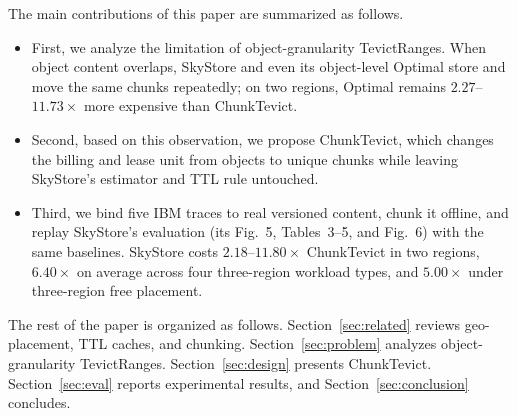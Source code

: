 The main contributions of this paper are summarized as follows.
\begin{itemize}
  \item First, we analyze the limitation of object-granularity TevictRanges.
  When object content overlaps, SkyStore and even its object-level Optimal store and move the same chunks repeatedly; on two regions, Optimal remains $2.27$--$11.73\times$ more expensive than ChunkTevict.
  \item Second, based on this observation, we propose ChunkTevict, which changes the billing and lease unit from objects to unique chunks while leaving SkyStore's estimator and {TTL} rule untouched.
  \item Third, we bind five {IBM} traces to real versioned content, chunk it offline, and replay SkyStore's evaluation (its Fig.~5, Tables~3--5, and Fig.~6) with the same baselines.
  SkyStore costs $2.18$--$11.80\times$ ChunkTevict in two regions, $6.40\times$ on average across four three-region workload types, and $5.00\times$ under three-region free placement.
\end{itemize}

The rest of the paper is organized as follows.
Section~\ref{sec:related} reviews geo-placement, {TTL} caches, and chunking.
Section~\ref{sec:problem} analyzes object-granularity TevictRanges.
Section~\ref{sec:design} presents ChunkTevict.
Section~\ref{sec:eval} reports experimental results, and Section~\ref{sec:conclusion} concludes.
